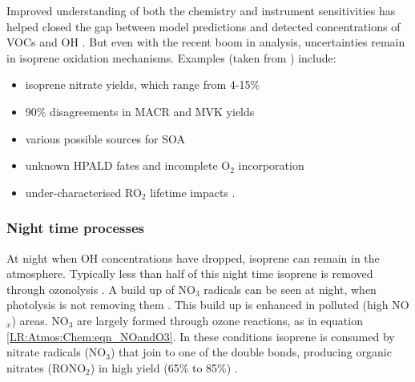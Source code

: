       
      
      Improved understanding of both the chemistry and instrument sensitivities has helped closed the gap between model predictions and detected concentrations of VOCs and OH \parencite{Mao2012}.
      But even with the recent boom in analysis, uncertainties remain in isoprene oxidation mechanisms.
      Examples (taken from \textcite{Nguyen2014}) include: 
      \begin{itemize}
        \item isoprene nitrate yields, which range from 4-15\% \parencite{Paulot2009a}
        \item 90\% disagreements in MACR and MVK yields \parencite{Liu2013}
        \item various possible sources for SOA \parencite{Chan2010, Surratt2010, Lin2013}
        \item unknown HPALD fates and incomplete O$_2$ incorporation \parencite{Peeters2009,Crounse2013}
        \item under-characterised RO$_2$ lifetime impacts \parencite{Wolfe2012}.
      \end{itemize}
      
      
    \subsubsection{Night time processes}
      At night when OH concentrations have dropped, isoprene can remain in the atmosphere.
      Typically less than half of this night time isoprene is removed through ozonolysis \parencite{AtkinsonArey2003}.
      A build up of NO$_3$ radicals can be seen at night, when photolysis is not removing them \parencite{Atkinson2000,Brown2009}.
      This build up is enhanced in polluted (high NO$_x$) areas.
      NO$_3$ are largely formed through ozone reactions, as in equation \ref{LR:Atmos:Chem:eqn_NOandO3}.
      In these conditions isoprene is consumed by nitrate radicals (NO$_3$) that join to one of the double bonds, producing organic nitrates (RONO$_2$) in high yield (65\% to 85\%) \parencite{Mao2013}.
      
